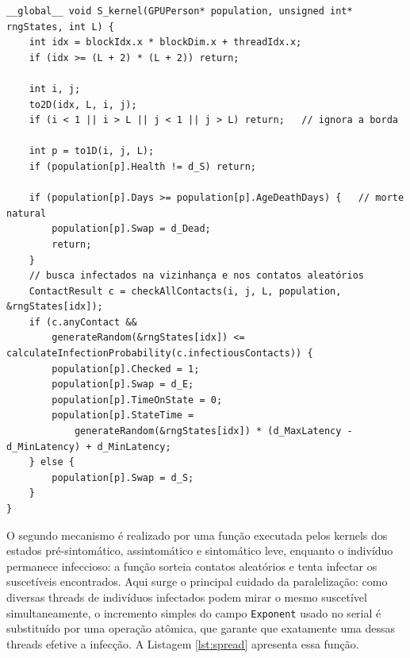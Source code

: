 \begin{lstlisting}[caption={Primeiro mecanismo: kernel do estado suscetível.}, label={lst:skernel}]
__global__ void S_kernel(GPUPerson* population, unsigned int* rngStates, int L) {
    int idx = blockIdx.x * blockDim.x + threadIdx.x;
    if (idx >= (L + 2) * (L + 2)) return;

    int i, j;
    to2D(idx, L, i, j);
    if (i < 1 || i > L || j < 1 || j > L) return;   // ignora a borda

    int p = to1D(i, j, L);
    if (population[p].Health != d_S) return;

    if (population[p].Days >= population[p].AgeDeathDays) {   // morte natural
        population[p].Swap = d_Dead;
        return;
    }
    // busca infectados na vizinhança e nos contatos aleatórios
    ContactResult c = checkAllContacts(i, j, L, population, &rngStates[idx]);
    if (c.anyContact &&
        generateRandom(&rngStates[idx]) <= calculateInfectionProbability(c.infectiousContacts)) {
        population[p].Checked = 1;
        population[p].Swap = d_E;
        population[p].TimeOnState = 0;
        population[p].StateTime =
            generateRandom(&rngStates[idx]) * (d_MaxLatency - d_MinLatency) + d_MinLatency;
    } else {
        population[p].Swap = d_S;
    }
}
\end{lstlisting}

O segundo mecanismo é realizado por uma função executada pelos kernels dos estados pré-sintomático, assintomático e sintomático leve, enquanto o indivíduo permanece infeccioso: a função sorteia contatos aleatórios e tenta infectar os suscetíveis encontrados. Aqui surge o principal cuidado da paralelização: como diversas threads de indivíduos infectados podem mirar o mesmo suscetível simultaneamente, o incremento simples do campo \texttt{Exponent} usado no serial é substituído por uma operação atômica, que garante que exatamente uma dessas threads efetive a infecção. A Listagem \ref{lst:spread} apresenta essa função.

